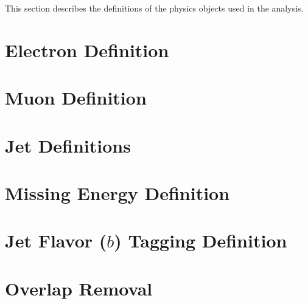 \label{chap:objects_def}
This section describes the definitions of the physics objects used in the analysis.
%

\section{Electron Definition}

\section{Muon Definition}

\section{Jet Definitions}

%
\clearpage
\section{Missing Energy Definition}

\section{Jet Flavor ($b$) Tagging Definition}

%
%
\section{Overlap Removal}

